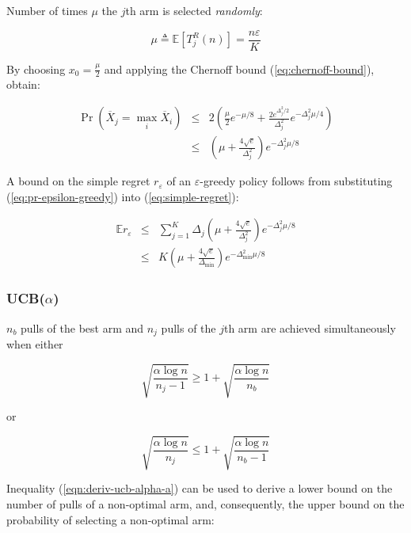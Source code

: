 \documentclass{article}
\newcommand {\IE} {\ensuremath {\mathbb{E}}}
\begin{document}
Number of times $\mu$ the $j$th arm is selected {\it randomly}:

\begin{equation}
\mu\triangleq\IE\left[T_j^R(n)\right]=\frac {n\varepsilon} K
\end{equation}

By choosing $x_0=\frac \mu 2$ and applying the Chernoff bound (\ref{eq:chernoff-bound}), obtain:

\begin{eqnarray}
\label{eq:pr-epsilon-greedy}
\Pr(\overline X_j=\max_i\overline X_i)&\le& 2\left(\frac {\mu}{2} e^{-\mu/8} + \frac {2e^{\Delta_j^2/2}}{\Delta_j^2}e^{-\Delta_j^2 \mu/4}\right)\nonumber\\
&\le&\left(\mu + \frac {4\sqrt e}{\Delta_j^2}\right)e^{-\Delta_j^2\mu/8}
\end{eqnarray}

A bound on the simple regret $r_\varepsilon$ of an
$\varepsilon$-greedy policy follows from substituting
(\ref{eq:pr-epsilon-greedy}) into (\ref{eq:simple-regret}):

\begin{eqnarray}
  \IE r_\varepsilon&\le&\sum_{j=1}^K\Delta_j\left(\mu + \frac {4\sqrt e}
{\Delta_j^2}\right)e^{-\Delta_j^2\mu/8}\nonumber\\
&\le&K\left(\mu + \frac {4\sqrt
    e}{\Delta_{\min}}\right)e^{-\Delta_{\min}^2\mu/8}
\label{eq:deriv-epsilon-greedy-b}
\end{eqnarray}

\subsubsection{UCB($\alpha$)}

$n_b$ pulls of the best arm and $n_j$ pulls of the $j$th arm are
achieved simultaneously when either 


\begin{equation}
\sqrt {\frac {\alpha \log n} {n_j-1}} \ge 1 + \sqrt { \frac {\alpha \log n} {n_b}}
\end{equation}

or

\begin{equation}
\sqrt {\frac {\alpha \log n} {n_j}} \le 1 + \sqrt { \frac {\alpha \log n} {n_b - 1}}
\label{eq:deriv-ucb-alpha-a}
\end{equation}

Inequality (\ref{eqn:deriv-ucb-alpha-a}) can be used to derive a lower
bound on the number of pulls of a non-optimal arm,  and, consequently, the upper
bound on the probability of selecting a non-optimal arm:
\end{document}

